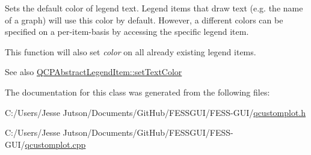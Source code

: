 Sets the default color of legend text. Legend items that draw text (e.\+g. the name of a graph) will use this color by default. However, a different colors can be specified on a per-\/item-\/basis by accessing the specific legend item.

This function will also set {\itshape color} on all already existing legend items.

\begin{DoxySeeAlso}{See also}
\hyperlink{class_q_c_p_abstract_legend_item_a6ebace6aaffaedcdab2d74e88acc2d1e}{Q\+C\+P\+Abstract\+Legend\+Item\+::set\+Text\+Color} 
\end{DoxySeeAlso}


The documentation for this class was generated from the following files\+:\begin{DoxyCompactItemize}
\item 
C\+:/\+Users/\+Jesse Jutson/\+Documents/\+Git\+Hub/\+F\+E\+S\+S\+G\+U\+I/\+F\+E\+S\+S-\/\+G\+U\+I/\hyperlink{qcustomplot_8h}{qcustomplot.\+h}\item 
C\+:/\+Users/\+Jesse Jutson/\+Documents/\+Git\+Hub/\+F\+E\+S\+S\+G\+U\+I/\+F\+E\+S\+S-\/\+G\+U\+I/\hyperlink{qcustomplot_8cpp}{qcustomplot.\+cpp}\end{DoxyCompactItemize}
